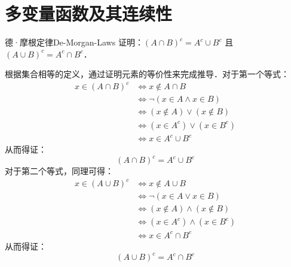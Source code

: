 \section{多变量函数及其连续性}

\begin{problem}{德·摩根定律}{De-Morgan-Laws}
    证明：$(A \cap B)^c = A^c \cup B^c$ 且 $(A \cup B)^c = A^c \cap B^c$．
\end{problem}

\begin{myproof}
    根据集合相等的定义，通过证明元素的等价性来完成推导．对于第一个等式：
    \begin{equation}
        \begin{aligned}
            x \in (A \cap B)^c & \iff x \notin A \cap B              \\
                               & \iff \neg (x \in A \land x \in B)   \\
                               & \iff (x \notin A) \lor (x \notin B) \\
                               & \iff (x \in A^c) \lor (x \in B^c)   \\
                               & \iff x \in A^c \cup B^c
        \end{aligned}
    \end{equation}
    从而得证：
    \begin{equation}
        \boxed{(A \cap B)^c = A^c \cup B^c}
    \end{equation}
    对于第二个等式，同理可得：
    \begin{equation}
        \begin{aligned}
            x \in (A \cup B)^c & \iff x \notin A \cup B               \\
                               & \iff \neg (x \in A \lor x \in B)     \\
                               & \iff (x \notin A) \land (x \notin B) \\
                               & \iff (x \in A^c) \land (x \in B^c)   \\
                               & \iff x \in A^c \cap B^c
        \end{aligned}
    \end{equation}
    从而得证：
    \begin{equation}
        \boxed{(A \cup B)^c = A^c \cap B^c}
    \end{equation}
\end{myproof}


